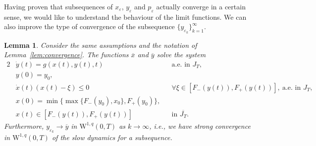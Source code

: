 \documentclass[12pt]{article}
\newtheorem{lem}[thm]{Lemma}
\def\I{\infty}
\def\I{\infty}
\begin{document}
Having proven that subsequences of $x_\varepsilon$, $y_\varepsilon$ and $p_\varepsilon$ 
actually converge in a certain sense, we would like to understand the behaviour of the 
limit functions. We can also improve the type of convergence of the subsequence 
$\{y_{\varepsilon_k}\}_{k=1}^\I$. 

\begin{lem}
\label{lem:Limit_equations}
Consider the same assumptions and the notation of Lemma~\ref{lem:convergence}.
The functions $\overline{x}$ and $\overline{y}$ solve the system 
\begin{alignat}{2}
	&\dot{y}(t) = g(x(t),y(t),t)\ && \text{a.e. in } J_T,\label{Eq:evol_x_1_Lem}\\
	& y(0) = y_0,\label{Eq:evol_x_2_Lem}\\
	&\dot{x}(t)(x(t)-\xi) \leq 0 && \forall\xi\in [F_-(y(t)), F_+(y(t))],\ 
	\text{a.e. in } J_T,\label{Eq:evol_y_1_Lem}\\
	&x(0) = \min \{\max \{F_-(y_0) , x_0\} ,F_+	(y_0)\},\label{Eq:evol_y_2_Lem}\\
	&x(t)\in [F_-(y(t)), F_+(y(t))] && 
	\text{in }\overline{J_T}.\label{Eq:evol_y_3_Lem}
\end{alignat}
Furthermore, $y_{\varepsilon_k}\rightarrow \overline{y}$ in $\mathrm{W}^{1,q}(0,T)$ 
as $k\rightarrow \infty$, i.e., we have strong convergence in $\mathrm{W}^{1,q}(0,T)$
of the slow dynamics for a subsequence.
\end{lem}
\end{document}
